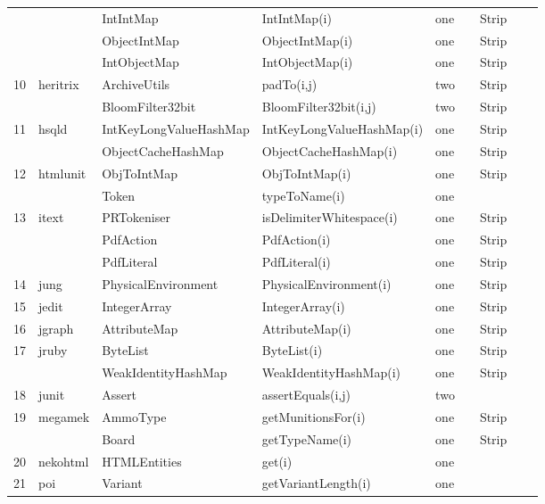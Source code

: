 \documentclass[runningheads,a4paper]{llncs}
\begin{document}
\begin{table}[h]
{\begin{tabular}{|l|l|l|l|l|l|l|l|l|}
	&				& IntIntMap				& IntIntMap(i)			& one		& 		& Strip							\\ 
	&				& ObjectIntMap			& ObjectIntMap(i)			& one		& 		& Strip 										\\ 
	&				& IntObjectMap			& IntObjectMap(i)			& one		& 		& Strip 										\\ 
10	&	heritrix		& ArchiveUtils			& padTo(i,j)				& two		& 		& Strip  										\\ 
	&				& BloomFilter32bit 		& BloomFilter32bit(i,j)		& two 		& 		& Strip  										\\ 
11	&	hsqld		& IntKeyLongValueHashMap& IntKeyLongValueHashMap(i)& one		& 		& Strip 										\\ 
	&				& ObjectCacheHashMap	& ObjectCacheHashMap(i)	& one		& 		& Strip   										\\ 
12	&	htmlunit		& ObjToIntMap			& ObjToIntMap(i)			& one		&		& Strip  										\\ 
	&				& Token					& typeToName(i)			& one		& 		&  										\\ 
13	&	itext		& PRTokeniser			& isDelimiterWhitespace(i)	& one		&		& Strip  										\\ 
	&				& PdfAction				& PdfAction(i)			& one		&		& Strip  										\\ 
	&				& PdfLiteral				& PdfLiteral(i)			& one		&		& Strip 										\\ 
14	&	jung		& PhysicalEnvironment	& PhysicalEnvironment(i)	& one		& 		& Strip 										\\ 
15	&	jedit		& IntegerArray			& IntegerArray(i)			& one		&		& Strip  										\\ 
16	&	jgraph		& AttributeMap			& AttributeMap(i)			& one		&		& Strip										\\ 
17	&	jruby		& ByteList				& ByteList(i)				& one		&		& Strip 										\\ 
	&				& WeakIdentityHashMap	& WeakIdentityHashMap(i)	& one		&		& Strip 										\\ 
18	&	junit		& Assert					& assertEquals(i,j)		& two		& 		&  										\\ 
19	&	megamek	& AmmoType			& getMunitionsFor(i)		& one		&		& Strip	  										\\ 			
	&				& Board					& getTypeName(i)		& one		& 		& Strip 										\\ 
20	&	nekohtml	& HTMLEntities			& get(i)					& one		&		&   										\\ 
21	&	poi			& Variant				& getVariantLength(i)		& one		&		&   										\\ 

\end{tabular}}
\end{table}
\end{document}
